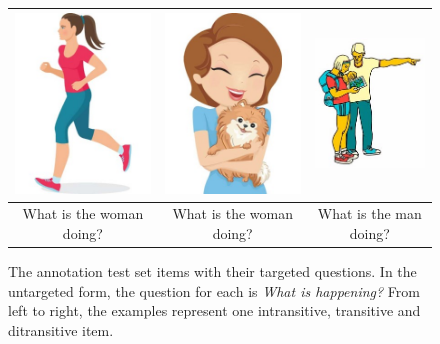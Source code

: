 \begin{figure}[htb!]
\begin{center}
\begin{tabular}{|c|c|c|}
\hline
{\includegraphics[width=0.29\columnwidth]{figures/I30.jpg}} & {\includegraphics[width=0.3\columnwidth]{figures/I29.jpg}} & {\includegraphics[width=0.3\columnwidth]{figures/I28.jpg}} \\
\hline
What is the woman doing? & What is the woman doing? & What is the man doing? \\
\hline
\end{tabular}
\caption{\label{fig:test-sample-items} The annotation test set items with their targeted questions. In the untargeted form, the question for each is \textit{What is happening?} From left to right, the examples represent one intransitive, transitive and ditransitive item.}
\end{center}
\end{figure}

